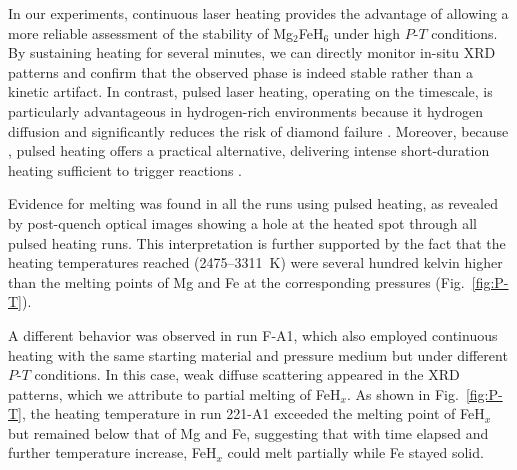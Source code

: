 \documentclass[draft,jgrga,12pt]{agujournal2019}
\begin{document}
In our experiments, continuous laser heating provides the advantage of allowing a more reliable assessment of the stability of Mg$_2$FeH$_6$ under high $P$-$T$ conditions. 
By sustaining heating for several minutes, we can directly monitor in-situ XRD patterns and confirm that the observed phase is indeed stable rather than a kinetic artifact.
In contrast, pulsed laser heating, operating on the  timescale, is particularly advantageous in hydrogen-rich environments because it  hydrogen diffusion and significantly reduces the risk of diamond failure \cite{goncharov_xray_2010,horn_building_2025}. 
Moreover, because  , pulsed heating offers a practical alternative, delivering intense short-duration heating sufficient to trigger reactions \cite{ning_mechanism_2019}.


Evidence for melting was found in all the runs using pulsed heating, as revealed by post-quench optical images showing a hole at the heated spot through all pulsed heating runs. This interpretation is further supported by the fact that the heating temperatures reached (2475--3311~K) were several hundred kelvin higher than the melting points of Mg and Fe at the corresponding pressures  (Fig.~\ref{fig:P-T}). 

A different behavior was observed in run F-A1, which also employed continuous heating with the same starting material and pressure medium but under different $P$-$T$ conditions. 
In this case, weak diffuse scattering appeared in the XRD patterns, which we attribute to partial melting of FeH$_x$. 
As shown in Fig.~\ref{fig:P-T}, the heating temperature in run 221-A1 exceeded the melting point of FeH$_x$ but remained below that of Mg and Fe, suggesting that with time elapsed and further temperature increase, FeH$_x$ could melt partially while Fe stayed solid.
\end{document}
